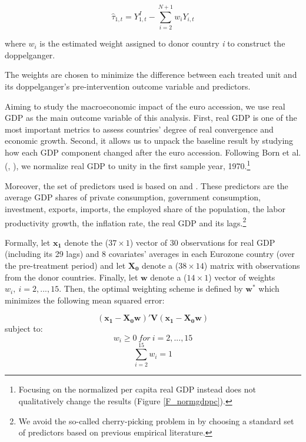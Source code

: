 \documentclass[12pt]{article}
\renewcommand{\vec}[1]{\mathbf{#1}}
\begin{document}
\begin{equation}
\label{EQ_objective}
    \hat{\tau}_{1,t} = Y_{1,t}^I - \sum\limits_{i=2}^{N+1} w_i Y_{i,t}
\end{equation}

where $w_i$ is the estimated weight assigned to donor country \textit{i} to construct the doppelganger.

The weights are chosen to minimize the difference between each treated unit and its doppelganger's pre-intervention outcome variable and predictors. 

Aiming to study the macroeconomic impact of the euro accession, we use real GDP as the main outcome variable of this analysis. First, real GDP is one of the most important metrics to assess countries' degree of real convergence and economic growth. Second, it allows us to unpack the baseline result by studying how each GDP component changed after the euro accession. Following Born et al. (\citeyear{Born2018}, \citeyear{Born2019}), we normalize real GDP to unity in the first sample year, 1970.\footnote{Focusing on the normalized per capita real GDP instead does not qualitatively change the results (Figure \ref{F_normgdppc}).}  

Moreover, the set of predictors used is based on \cite{Abadie2003} and \cite{Born2019}. These predictors are the average GDP shares of private consumption, government consumption, investment, exports, imports, the employed share of the population, the labor productivity growth, the inflation rate, the real GDP and its lags.\footnote{We avoid the so-called cherry-picking problem in \cite{Ferman2017} by choosing a standard set of predictors based on previous empirical literature.}

Formally, let $\vec{x_1}$ denote the ($37 \times 1$) vector of $30$ observations for real GDP (including its 29 lags) and $8$ covariates' averages in each Eurozone country (over the pre-treatment period) and let $\vec{X_0}$ denote a ($38 \times 14$) matrix with observations from the donor countries. Finally, let $\vec{w}$ denote a ($14 \times 1$) vector of weights $w_i, \ i=2,...,15$. Then, the optimal weighting scheme is defined by $\vec{w^*}$ which minimizes the following mean squared error:

\begin{equation}
    \label{EQ_min}
    (\vec{x_1}-\vec{X_0}\vec{w})'\vec{V}(\vec{x_1}-\vec{X_0}\vec{w})
\end{equation}
\indent subject to:
\begin{equation}
    w_i \geq 0 \ for \ i=2,...,15
\end{equation}
\begin{equation}
    \sum_{i=2}^{15} w_i = 1
\end{equation}
\end{document}
